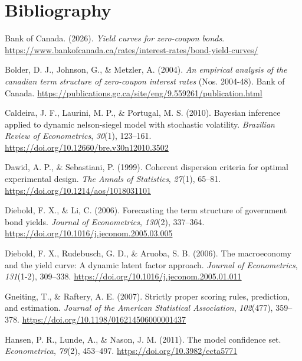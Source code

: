 \documentclass[
  12pt,
  letterpaper,
  DIV=11,
  numbers=noendperiod]{scrreprt}
\newlength{\cslhangindent}
\newenvironment{CSLReferences}[2] %
 {\begin{list}{}{%
  \setlength{\itemindent}{0pt}
  \setlength{\leftmargin}{0pt}
  \setlength{\parsep}{0pt}
  \ifodd #1
   \setlength{\leftmargin}{\cslhangindent}
   \setlength{\itemindent}{-1\cslhangindent}
  \fi
  \setlength{\itemsep}{#2\baselineskip}}}
 {\end{list}}
\begin{document}
\chapter*{Bibliography}\label{bibliography}

\protect{}\label{refs}
\begin{CSLReferences}{1}{0}
Bank of Canada. (2026). \emph{Yield curves for zero-coupon bonds}.
\url{https://www.bankofcanada.ca/rates/interest-rates/bond-yield-curves/}

Bolder, D. J., Johnson, G., \& Metzler, A. (2004). \emph{An empirical
analysis of the canadian term structure of zero-coupon interest rates}
(Nos. 2004-48). Bank of Canada.
\url{https://publications.gc.ca/site/eng/9.559261/publication.html}

Caldeira, J. F., Laurini, M. P., \& Portugal, M. S. (2010). Bayesian
inference applied to dynamic nelson-siegel model with stochastic
volatility. \emph{Brazilian Review of Econometrics}, \emph{30}(1),
123--161. \url{https://doi.org/10.12660/bre.v30n12010.3502}

Dawid, A. P., \& Sebastiani, P. (1999). Coherent dispersion criteria for
optimal experimental design. \emph{The Annals of Statistics},
\emph{27}(1), 65--81. \url{https://doi.org/10.1214/aos/1018031101}

Diebold, F. X., \& Li, C. (2006). Forecasting the term structure of
government bond yields. \emph{Journal of Econometrics}, \emph{130}(2),
337--364. \url{https://doi.org/10.1016/j.jeconom.2005.03.005}

Diebold, F. X., Rudebusch, G. D., \& Aruoba, S. B. (2006). The
macroeconomy and the yield curve: A dynamic latent factor approach.
\emph{Journal of Econometrics}, \emph{131}(1-2), 309--338.
\url{https://doi.org/10.1016/j.jeconom.2005.01.011}

Gneiting, T., \& Raftery, A. E. (2007). Strictly proper scoring rules,
prediction, and estimation. \emph{Journal of the American Statistical
Association}, \emph{102}(477), 359--378.
\url{https://doi.org/10.1198/016214506000001437}

Hansen, P. R., Lunde, A., \& Nason, J. M. (2011). The model confidence
set. \emph{Econometrica}, \emph{79}(2), 453--497.
\url{https://doi.org/10.3982/ecta5771}


\end{CSLReferences}
\end{document}
